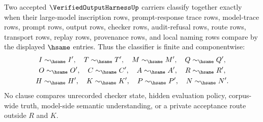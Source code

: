 \begin{definition}
\label{def:verified-output-harness-classifier}
Two accepted $\VerifiedOutputHarnessUp$ carriers classify together exactly when their large-model inscription rows, prompt-response trace rows, model-trace rows, prompt rows, output rows, checker rows, audit-refusal rows, route rows, transport rows, replay rows, provenance rows, and local naming rows compare by the displayed $\hsame$ entries. Thus the classifier is finite and componentwise:
$$
\begin{gathered}
I\sim_{\hsame}I',\quad T\sim_{\hsame}T',\quad M\sim_{\hsame}M',\quad Q\sim_{\hsame}Q',\\
O\sim_{\hsame}O',\quad C\sim_{\hsame}C',\quad A\sim_{\hsame}A',\quad R\sim_{\hsame}R',\\
H\sim_{\hsame}H',\quad K\sim_{\hsame}K',\quad P\sim_{\hsame}P',\quad N\sim_{\hsame}N'.
\end{gathered}
$$
No clause compares unrecorded checker state, hidden evaluation policy, corpus-wide truth, model-side semantic understanding, or a private acceptance route outside $R$ and $K$.
\end{definition}

